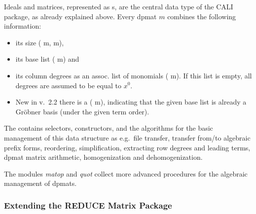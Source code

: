 Ideals and matrices, represented as s, are the central
data type of the CALI package, as already explained above. Every
dpmat $m$ combines the following information:
\begin{itemize}
\item its size ( m, m),

\item its base list ( m) and

\item its column degrees as an assoc. list of monomials
( m). If this list is empty, all degrees are
assumed to be equal to $x^0$.

\item New in v.\ 2.2 there is a  ( m),
indicating that the given base list is already a Gr\"obner basis (under the
given term order). 
\end{itemize}

The  contains selectors, constructors, and the
algorithms for the basic management of this data structure as e.g.\
file transfer, transfer from/to algebraic prefix forms, reordering,
simplification, extracting row degrees and leading terms, dpmat matrix
arithmetic, homogenization and dehomogenization. 

The modules \emph{matop} and \emph{quot} collect more advanced procedures 
for the algebraic management of dpmats.

\subsubsection{Extending the REDUCE Matrix Package}

